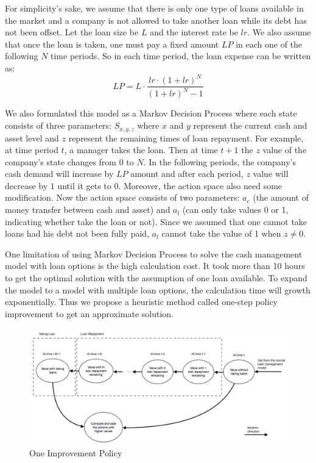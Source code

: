 \documentclass[12pt]{article}
\begin{document}
For simplicity's sake, we assume that there is only one type of loans available in the market and a company is not allowed to take another loan while its debt has not been offset. Let the loan size be $L$ and the interest rate be $lr$. We also assume that once the loan is taken, one must pay a fixed amount $LP$ in each one of the following $N$ time periods. So in each time period, the loan expense can be written as: $$LP = L \cdot \frac{lr \cdot (1+lr)^N}{(1+lr)^N-1}$$
 
 We also formulated this model as a Markov Decision Process where each state consists of three parameters: $S_{x,y,z}$ where $x$ and $y$ represent the current cash and asset level and $z$ represent the remaining times of loan repayment. For example, at time period $t$, a manager takes the loan. Then at time $t+1$ the $z$ value of the company's state changes from $0$ to $N$. In the following periods, the company's cash demand will increase by $LP$ amount and after each period, $z$ value will decrease by $1$ until it gets to $0$. Moreover, the action space also need some modification. Now the action space consists of two parameters: $a_c$ (the amount of money transfer between cash and asset) and $a_l$ (can only take values 0 or 1, indicating whether take the loan or not). Since we assumed that one cannot take loans had his debt not been fully paid, $a_l$ cannot take the value of 1 when $z \neq 0$.
 




One limitation of using Markov Decision Process to solve the cash management model with loan options is the high calculation cost. It took more than 10 hours to get the optimal solution with the assumption of one loan available. To expand the model to a model with multiple loan options, the calculation time will growth exponentially. Thus we propose a heuristic method called one-step policy improvement to get an approximate solution.
\begin{figure}
\begin{center}
\includegraphics[scale=.28]{oneImprov}
\end{center}
\caption{One Improvement Policy}
\label{oneImprov}
\end{figure}
\end{document}
